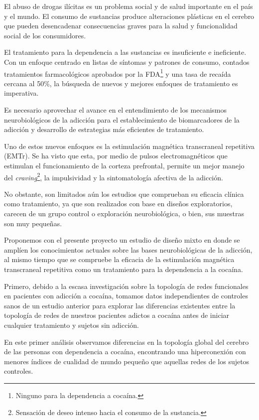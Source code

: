 El abuso de drogas ilícitas es un problema social y de salud importante en el país y el mundo.
El consumo de sustancias produce alteraciones plásticas en el
cerebro que pueden desencadenar consecuencias graves para la salud y funcionalidad
social de los consumidores. \par
El tratamiento para la dependencia a las sustancias es insuficiente e ineficiente.
Con un enfoque centrado en listas de síntomas y patrones de consumo, contados tratamientos farmacológicos aprobados por la FDA\footnote{Ninguno para la dependencia a cocaína.}
y una tasa de recaída cercana al 50\%, la búsqueda de nuevos y mejores enfoques de tratamiento es imperativa.\par
Es necesario aprovechar el avance en el entendimiento de los mecanismos neurobiológicos de la adicción para el establecimiento de biomarcadores de la adicción y desarrollo de estrategias más eficientes de tratamiento.\par
Uno de estos nuevos enfoques es la estimulación magnética transcraneal repetitiva (EMTr). Se ha visto que esta, por medio de pulsos electromagnéticos que estimulan el funcionamiento de la corteza prefrontal, permite un mejor manejo del \textit{craving}\footnote{Sensación de deseo intenso hacia el consumo de la sustancia.}, la impulsividad y la sintomatología afectiva de la adicción. \par
No obstante, son limitados aún los estudios que comprueban su eficacia clínica como tratamiento, ya que son realizados con base en diseños exploratorios, carecen de un grupo control o exploración neurobiológica, o bien, sus muestras son muy pequeñas.\par
Proponemos con el presente proyecto un estudio de diseño mixto en donde se amplíen los conocimientos actuales sobre las bases neurobiológicas de la adicción, al mismo tiempo que se compruebe la eficacia de la estimulación magnética transcraneal repetitiva como un tratamiento para la dependencia a la cocaína.\par
Primero, debido a la escasa investigación sobre la topología de redes funcionales en pacientes con adicción a cocaína,  tomamos datos independientes de controles sanos de un estudio anterior para explorar las diferencias existentes entre la topología de redes de nuestros pacientes adictos a cocaína antes de iniciar cualquier tratamiento y sujetos sin adicción.\par
En este primer análisis observamos diferencias en la topología global del cerebro de las personas con dependencia a cocaína, encontrando una hiperconexión con menores índices de cualidad de mundo pequeño que aquellas redes de los sujetos controles.\par
